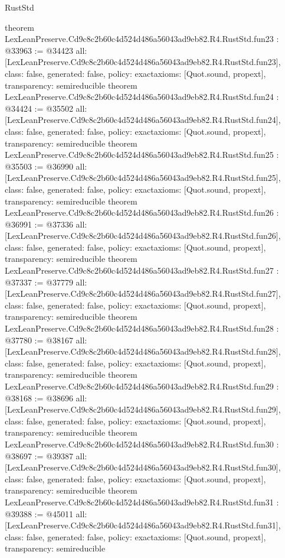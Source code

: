 \begin{lexlean}{RustStd}
\begin{coremodule}
{}
theorem LexLeanPreserve.Cd9c8c2b60c4d524d486a56043ad9eb82.R4.RustStd.fun23 : @33963 := @34423 {
  all: [LexLeanPreserve.Cd9c8c2b60c4d524d486a56043ad9eb82.R4.RustStd.fun23],
  class: false,
  generated: false,
  policy: exact{axioms: [Quot.sound, propext]},
  transparency: semireducible
}
theorem LexLeanPreserve.Cd9c8c2b60c4d524d486a56043ad9eb82.R4.RustStd.fun24 : @34424 := @35502 {
  all: [LexLeanPreserve.Cd9c8c2b60c4d524d486a56043ad9eb82.R4.RustStd.fun24],
  class: false,
  generated: false,
  policy: exact{axioms: [Quot.sound, propext]},
  transparency: semireducible
}
theorem LexLeanPreserve.Cd9c8c2b60c4d524d486a56043ad9eb82.R4.RustStd.fun25 : @35503 := @36990 {
  all: [LexLeanPreserve.Cd9c8c2b60c4d524d486a56043ad9eb82.R4.RustStd.fun25],
  class: false,
  generated: false,
  policy: exact{axioms: [Quot.sound, propext]},
  transparency: semireducible
}
theorem LexLeanPreserve.Cd9c8c2b60c4d524d486a56043ad9eb82.R4.RustStd.fun26 : @36991 := @37336 {
  all: [LexLeanPreserve.Cd9c8c2b60c4d524d486a56043ad9eb82.R4.RustStd.fun26],
  class: false,
  generated: false,
  policy: exact{axioms: [Quot.sound, propext]},
  transparency: semireducible
}
theorem LexLeanPreserve.Cd9c8c2b60c4d524d486a56043ad9eb82.R4.RustStd.fun27 : @37337 := @37779 {
  all: [LexLeanPreserve.Cd9c8c2b60c4d524d486a56043ad9eb82.R4.RustStd.fun27],
  class: false,
  generated: false,
  policy: exact{axioms: [Quot.sound, propext]},
  transparency: semireducible
}
theorem LexLeanPreserve.Cd9c8c2b60c4d524d486a56043ad9eb82.R4.RustStd.fun28 : @37780 := @38167 {
  all: [LexLeanPreserve.Cd9c8c2b60c4d524d486a56043ad9eb82.R4.RustStd.fun28],
  class: false,
  generated: false,
  policy: exact{axioms: [Quot.sound, propext]},
  transparency: semireducible
}
theorem LexLeanPreserve.Cd9c8c2b60c4d524d486a56043ad9eb82.R4.RustStd.fun29 : @38168 := @38696 {
  all: [LexLeanPreserve.Cd9c8c2b60c4d524d486a56043ad9eb82.R4.RustStd.fun29],
  class: false,
  generated: false,
  policy: exact{axioms: [Quot.sound, propext]},
  transparency: semireducible
}
theorem LexLeanPreserve.Cd9c8c2b60c4d524d486a56043ad9eb82.R4.RustStd.fun30 : @38697 := @39387 {
  all: [LexLeanPreserve.Cd9c8c2b60c4d524d486a56043ad9eb82.R4.RustStd.fun30],
  class: false,
  generated: false,
  policy: exact{axioms: [Quot.sound, propext]},
  transparency: semireducible
}
theorem LexLeanPreserve.Cd9c8c2b60c4d524d486a56043ad9eb82.R4.RustStd.fun31 : @39388 := @45011 {
  all: [LexLeanPreserve.Cd9c8c2b60c4d524d486a56043ad9eb82.R4.RustStd.fun31],
  class: false,
  generated: false,
  policy: exact{axioms: [Quot.sound, propext]},
  transparency: semireducible
}
\end{coremodule}
\end{lexlean}
